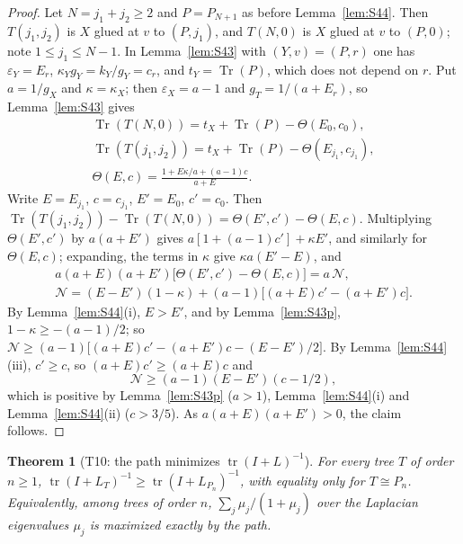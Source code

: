 \documentclass[11pt]{amsart}
\newtheorem{theorem}{Theorem}[section]
\theoremstyle{definition}
\theoremstyle{remark}
\newcommand{\tr}{\operatorname{tr}}
\newcommand{\Tr}{\operatorname{Tr}}
\begin{document}
\begin{proof}
Let $N=j_1+j_2\ge2$ and $P=P_{N+1}$ as before Lemma~\ref{lem:S44}. Then
$T(j_1,j_2)$ is $X$ glued at $v$ to $(P,j_1)$, and $T(N,0)$ is $X$ glued at
$v$ to $(P,0)$; note $1\le j_1\le N-1$. In Lemma~\ref{lem:S43} with
$(Y,v)=(P,r)$ one has $\varepsilon_Y=E_r$, $\kappa_Yg_Y=k_Y/g_Y=c_r$, and
$t_Y=\Tr(P)$, which does not depend on $r$. Put $a=1/g_X$ and
$\kappa=\kappa_X$; then $\varepsilon_X=a-1$ and $g_T=1/(a+E_r)$, so
Lemma~\ref{lem:S43} gives
\begin{gather*}
\Tr(T(N,0))=t_X+\Tr(P)-\Theta(E_0,c_0),\\
\Tr(T(j_1,j_2))=t_X+\Tr(P)-\Theta(E_{j_1},c_{j_1}),\\
\Theta(E,c)=\frac{1+E\kappa/a+(a-1)c}{a+E}.
\end{gather*}
Write $E=E_{j_1}$, $c=c_{j_1}$, $E'=E_0$, $c'=c_0$. Then
$\Tr(T(j_1,j_2))-\Tr(T(N,0))=\Theta(E',c')-\Theta(E,c)$. Multiplying
$\Theta(E',c')$ by $a(a+E')$ gives $a[1+(a-1)c']+\kappa E'$, and similarly
for $\Theta(E,c)$; expanding, the terms in $\kappa$ give $\kappa a(E'-E)$, and
\begin{gather*}
a(a+E)(a+E')\bigl[\Theta(E',c')-\Theta(E,c)\bigr]=a\,\mathcal N,\\
\mathcal N=(E-E')(1-\kappa)+(a-1)\bigl[(a+E)c'-(a+E')c\bigr].
\end{gather*}
By Lemma~\ref{lem:S44}(i), $E>E'$, and by Lemma~\ref{lem:S43p},
$1-\kappa\ge-(a-1)/2$; so
$\mathcal N\ge(a-1)\bigl[(a+E)c'-(a+E')c-(E-E')/2\bigr]$. By
Lemma~\ref{lem:S44}(iii), $c'\ge c$, so $(a+E)c'\ge(a+E)c$ and
\[
\mathcal N\ge(a-1)(E-E')(c-1/2),
\]
which is positive by Lemma~\ref{lem:S43p} ($a>1$), Lemma~\ref{lem:S44}(i)
and Lemma~\ref{lem:S44}(ii) ($c>3/5$). As $a(a+E)(a+E')>0$, the claim
follows.
\end{proof}

\begin{theorem}[T10: the path minimizes $\tr(I+L)^{-1}$]\label{thm:T10}
For every tree $T$ of order $n\ge1$, $\tr(I+L_T)^{-1}\ge\tr(I+L_{P_n})^{-1}$,
with equality only for $T\cong P_n$. Equivalently, among trees of order $n$,
$\sum_j\mu_j/(1+\mu_j)$ over the Laplacian eigenvalues $\mu_j$ is maximized
exactly by the path.
\end{theorem}
\end{document}
